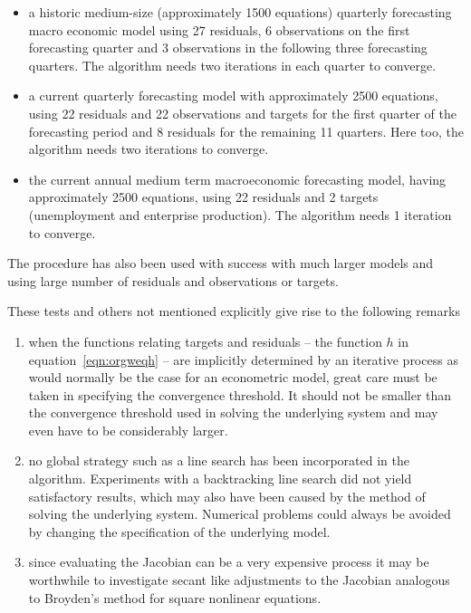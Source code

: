 \documentclass[english,memorandum,old,sectionpage]{cpbart}
\begin{document}
\begin{itemize}

\item a historic medium-size (approximately 1500 equations) quarterly
forecasting macro economic model using 27 residuals,
6 observations on the first forecasting quarter and 3 observations
in the following three forecasting quarters. The algorithm
needs two iterations in each quarter to converge.

\item a current quarterly forecasting model with approximately 2500 equations,
using 22 residuals
and 22 observations and targets for the first quarter of the
forecasting period and 8 residuals for the remaining 11 quarters.
Here too, the algorithm needs two iterations to converge.

\item the current annual medium term macroeconomic forecasting model,
having approximately 2500 equations,
using 22 residuals and 2 targets (unemployment and enterprise production).
The algorithm needs 1 iteration to converge.
\end{itemize}
%
The procedure has also been used with success with much larger models and
using large number of residuals and observations or targets.

These tests and others not mentioned explicitly give
rise to the following remarks

\begin{enumerate}
\item when the functions relating targets and residuals
      -- the function $h$ in equation~\ref{eqn:orgweqh} --
      are implicitly determined by an iterative process
      as would normally be the case for an econometric model, great care
      must be taken in specifying
      the convergence threshold. It should not be smaller than the
      convergence threshold used in solving the underlying system and
      may even have to be considerably larger.

\item no global strategy such as a line search has been incorporated in
      the algorithm. Experiments with a backtracking line search did not
      yield satisfactory results, which may also have been caused by the
      method of solving the underlying system. Numerical problems
      could always be avoided by changing
      the specification of the underlying model.

\item since evaluating the Jacobian can be a very expensive process
      it may be worthwhile to investigate secant like adjustments to the
      Jacobian analogous to Broyden's method for square nonlinear
      equations.
\end{enumerate}

\clearpage


\end{document}
